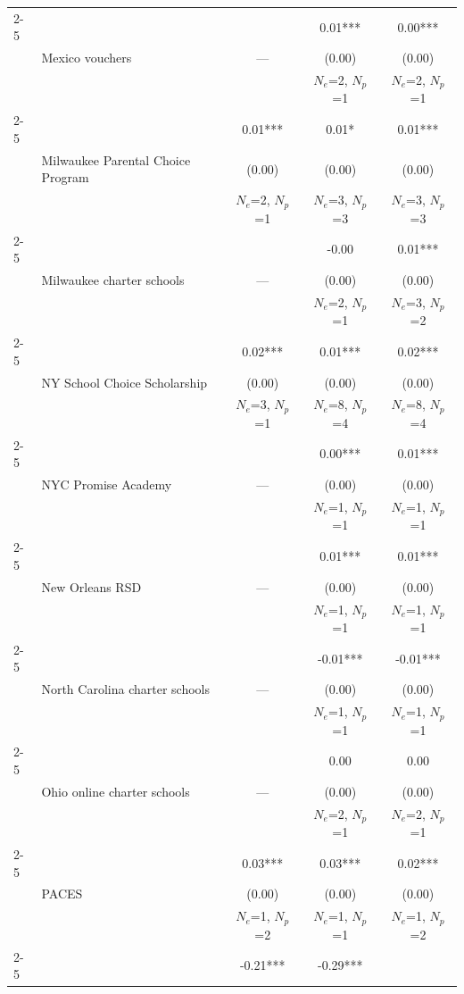 \begin{longtable}{@{\extracolsep{\fill}} l l c c c @{}}
\cmidrule(lr){2-5}
  &  &  & 0.01*** & 0.00*** \\
  & Mexico vouchers & --- & (0.00) & (0.00) \\
  &  &  & $N_e$=2, $N_p$=1 & $N_e$=2, $N_p$=1 \\
\cmidrule(lr){2-5}
  &  & 0.01*** & 0.01* & 0.01*** \\
  & Milwaukee Parental Choice Program & (0.00) & (0.00) & (0.00) \\
  &  & $N_e$=2, $N_p$=1 & $N_e$=3, $N_p$=3 & $N_e$=3, $N_p$=3 \\
\cmidrule(lr){2-5}
  &  &  & -0.00 & 0.01*** \\
  & Milwaukee charter schools & --- & (0.00) & (0.00) \\
  &  &  & $N_e$=2, $N_p$=1 & $N_e$=3, $N_p$=2 \\
\cmidrule(lr){2-5}
  &  & 0.02*** & 0.01*** & 0.02*** \\
  & NY School Choice Scholarship & (0.00) & (0.00) & (0.00) \\
  &  & $N_e$=3, $N_p$=1 & $N_e$=8, $N_p$=4 & $N_e$=8, $N_p$=4 \\
\cmidrule(lr){2-5}
  &  &  & 0.00*** & 0.01*** \\
  & NYC Promise Academy & --- & (0.00) & (0.00) \\
  &  &  & $N_e$=1, $N_p$=1 & $N_e$=1, $N_p$=1 \\
\cmidrule(lr){2-5}
  &  &  & 0.01*** & 0.01*** \\
  & New Orleans RSD & --- & (0.00) & (0.00) \\
  &  &  & $N_e$=1, $N_p$=1 & $N_e$=1, $N_p$=1 \\
\cmidrule(lr){2-5}
  &  &  & -0.01*** & -0.01*** \\
  & North Carolina charter schools & --- & (0.00) & (0.00) \\
  &  &  & $N_e$=1, $N_p$=1 & $N_e$=1, $N_p$=1 \\
\cmidrule(lr){2-5}
  &  &  & 0.00 & 0.00 \\
  & Ohio online charter schools & --- & (0.00) & (0.00) \\
  &  &  & $N_e$=2, $N_p$=1 & $N_e$=2, $N_p$=1 \\
\cmidrule(lr){2-5}
  &  & 0.03*** & 0.03*** & 0.02*** \\
  & PACES & (0.00) & (0.00) & (0.00) \\
  &  & $N_e$=1, $N_p$=2 & $N_e$=1, $N_p$=1 & $N_e$=1, $N_p$=2 \\
\cmidrule(lr){2-5}
  &  & -0.21*** & -0.29*** &  \\

\end{longtable}

